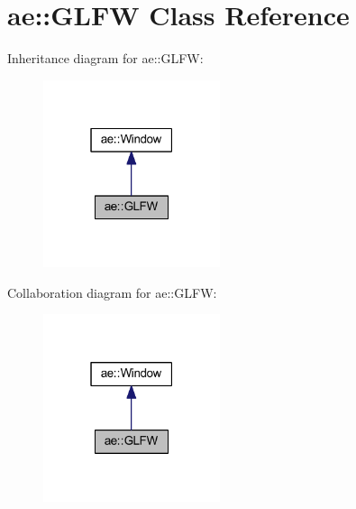 \hypertarget{classae_1_1_g_l_f_w}{}\section{ae\+:\+:G\+L\+FW Class Reference}
\label{classae_1_1_g_l_f_w}


Inheritance diagram for ae\+:\+:G\+L\+FW\+:\nopagebreak
\begin{figure}[H]
\begin{center}
\leavevmode
\includegraphics[width=147pt]{classae_1_1_g_l_f_w__inherit__graph}
\end{center}
\end{figure}


Collaboration diagram for ae\+:\+:G\+L\+FW\+:\nopagebreak
\begin{figure}[H]
\begin{center}
\leavevmode
\includegraphics[width=147pt]{classae_1_1_g_l_f_w__coll__graph}
\end{center}
\end{figure}
